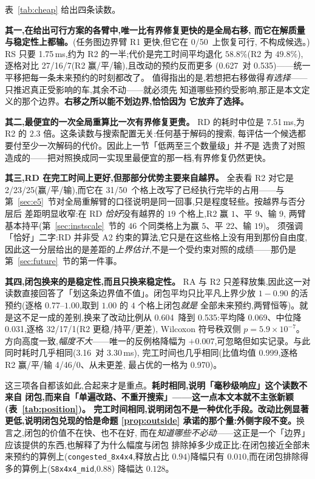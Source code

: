 \documentclass[manuscript,screen,review]{acmart}
\newcommand{\NPairs}{50}
\newcommand{\FeasRone}{0/\NPairs}            %
\newcommand{\ClosureAliveFrac}{90\%}
\newcommand{\MsShift}{1.75}          %
\newcommand{\MsRedecode}{7.51}       %
\newcommand{\MsAllFuture}{3.30}      %
\newcommand{\MsCheapRtwo}{3.16}      %
\newcommand{\RedecodeBad}{31/\NPairs}
\newcommand{\WinVsShift}{27/16/7}    %
\newcommand{\WinVsRedecode}{2/23/25}
\newcommand{\WinVsAllFuture}{4/46/0}
\newcommand{\ResFracCheapRtwo}{0.535}
\newcommand{\ResFracShift}{0.627}
\newcommand{\ResFracAllFuture}{0.604}
\newcommand{\RAStabWTL}{32/17/1}     %
\newcommand{\RAStabP}{5.9\times10^{-7}}  %
\newcommand{\RAStabMean}{0.069}      %
\newcommand{\RAStabMed}{0.031}       %
\newcommand{\RACmaxRatio}{0.999}     %
\newcommand{\RACmaxLo}{0.970}        %
\newcommand{\ClosureShareLo}{0.77}   %
\newcommand{\ClosureShareMean}{0.90} %
\begin{document}
表~\ref{tab:cheap} 给出四条读数。

\textbf{其一,在给出可行方案的各臂中,唯一比有界修复更快的是全局右移,
而它在解质量与稳定性上都输。}(任务图边界臂 R1 更快,但它在 \FeasRone\ 上恢复可行,
不构成候选。)
RS 只要 \MsShift\,ms,约为 R2 的一半;代价是完工时间平均退化 \(58.8\%\)(R2 为
\(49.8\%\)),逐格对比 \WinVsShift(R2 赢/平/输),且改动的预约反而更多
(\ResFracShift\ 对 \ResFracCheapRtwo)——统一平移把每一条未来预约的时刻都改了。
值得指出的是,若想把右移做得\emph{有选择}——只推迟真正受影响的车,其余不动——就必须先
知道哪些预约受影响,那正是本文定义的那个边界。\textbf{右移之所以能不划边界,恰恰因为
它放弃了选择。}

\textbf{其二,最便宜的一次全局重算比一次有界修复更贵。} RD 的耗时中位是
\MsRedecode\,ms,为 R2 的 \(2.3\) 倍。这条读数与搜索配置无关:任何基于解码的搜索,
每评估一个候选都要付至少一次解码的代价。因此上一节「低两至三个数量级」并\emph{不}是
选贵了对照造成的——把对照换成同一实现里最便宜的那一档,有界修复仍然更快。

\textbf{其三,RD 在完工时间上更好,但那部分优势主要来自越界。} 全表看 R2 对它是
\WinVsRedecode(赢/平/输),而它在 \RedecodeBad\ 个格上改写了已经执行完毕的占用——与
第~\ref{sec:e5}~节对全局重解臂的口径说明是同一回事,只是程度轻些。按越界与否分层后
差距明显收窄:在 RD \emph{恰好}没有越界的 \(19\) 个格上,R2 赢 \(1\)、平 \(9\)、输 \(9\),
两臂基本持平(第~\ref{sec:instscale}~节的 \(46\) 个同类格上为赢 \(5\)、平 \(22\)、输 \(19\))。
须强调「恰好」二字:RD 并非受 A2 约束的算法,它只是在这些格上没有用到那份自由度,
因此这一分层给出的是差距的\emph{上界估计},不是一个受约束对照的成绩——那仍是
第~\ref{sec:future}~节的第一件事。

\textbf{其四,闭包换来的是稳定性,而且只换来稳定性。} RA 与 R2 只差释放集,因此这一对
读数直接回答了「划这条边界值不值」。闭包平均只比平凡上界少放 \(1-\ClosureShareMean\)
的活预约(逐格 \ClosureShareLo--\(1.00\),取到 \(1.00\) 的 \(4\) 个格上闭包\emph{就是}
全部未来预约,两臂恒等)。就是这不足一成的差别,换来了改动比例从 \ResFracAllFuture\ 降到
\ResFracCheapRtwo:平均降 \RAStabMean、中位降 \RAStabMed,逐格 \RAStabWTL(R2 更稳/持平/更差),
Wilcoxon 符号秩双侧 \(p=\RAStabP\)。方向高度一致,\emph{幅度不大}——唯一的反例格降幅为
\(+0.007\),可忽略但如实记录。与此同时耗时几乎相同(\MsCheapRtwo\ 对 \MsAllFuture\,ms),
完工时间也几乎相同(比值均值 \RACmaxRatio,逐格 R2 赢/平/输 \WinVsAllFuture、从未更差,
最占优的一格为 \RACmaxLo)。

这三项各自都该如此,合起来才是重点。\textbf{耗时相同,说明「毫秒级响应」这个读数不来自
闭包,而来自「单遍改路、不重开搜索」——这一点本文本就不主张新颖(表~\ref{tab:position})。
完工时间相同,说明闭包不是一种优化手段。改动比例显著更低,说明闭包兑现的恰是命题
\ref{prop:outside} 承诺的那个量:外侧字段不变。}换言之,闭包的价值不在快、也不在好,
而在\emph{知道哪些不必动}——这正是一个「边界」应该提供的东西,也解释了为什么幅度与闭包
排除掉多少成正比:在闭包接近全部未来预约的算例上(\texttt{congested\_8x4x4},释放占比
\(0.94\))降幅只有 \(0.010\),而在闭包排除得多的算例上(\texttt{S8x4x4\_mid},\(0.88\))
降幅达 \(0.128\)。
\end{document}
